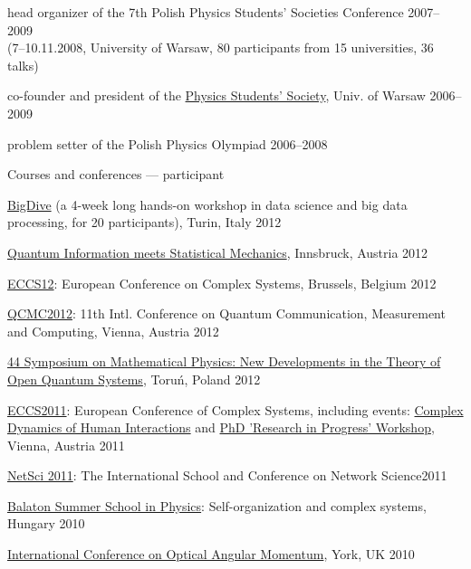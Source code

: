\documentclass[margin,line]{resume}
\begin{document}
\begin{resume}
\begin{list2}
        \item head organizer of the 7th Polish Physics Students' Societies Conference \hfill 2007--2009\\
        (7--10.11.2008, University of Warsaw, 80 participants from 15 universities, 36 talks)
        \item co-founder and president of the \href{http://skfiz.fuw.edu.pl/en}{Physics Students' Society}, Univ. of Warsaw \hfill 2006--2009
         \item problem setter of the Polish Physics Olympiad \hfill 2006--2008
        \end{list2} 
	
	Courses and conferences --- participant 
	        \begin{list2}
        \item \href{http://bigdive.eu}{BigDive} (a 4-week long hands-on workshop in data science and big data processing, for 20 participants), Turin, Italy \hfill {2012}
        \item \href{http://www.uibk.ac.at/th-physik/qism2012/}{Quantum Information meets Statistical Mechanics}, Innsbruck, Austria \hfill 2012
        \item \href{http://www.eccs2012.eu/}{ECCS12}: European Conference on Complex Systems, Brussels, Belgium \hfill 2012
        \item \href{http://qcmc2012.org/}{QCMC2012}: 11th Intl. Conference on Quantum Communication, Measurement and Computing, Vienna, Austria \hfill 2012
        \item \href{http://www.fizyka.umk.pl/zfmis/smp44/}{44 Symposium on Mathematical Physics: New Developments in the Theory of Open Quantum Systems}, Toruń, Poland  \hfill 2012
	    \item \href{http://www.eccs2011.eu/}{ECCS2011}: European Conference of Complex Systems, including events: \href{http://markov.uc3m.es/complexdynamics11/Home.html}{Complex Dynamics of Human Interactions} and \href{http://cssociety.org/PhDVienna2011}{PhD 'Research in Progress' Workshop}, Vienna, Austria  \hfill 2011
	    \item \href{http://netsci2011.net/}{NetSci 2011}: The International School and Conference on Network Science\hfill 2011
	    \item \href{http://bss.mafihe.hu/}{Balaton Summer School in Physics}: Self-organization and complex systems, Hungary \hfill 2010
        \item \href{http://www.icoam.org/}{International Conference on Optical Angular Momentum}, York, UK \hfill 2010

\end{list2}
\end{resume}
\end{document}
